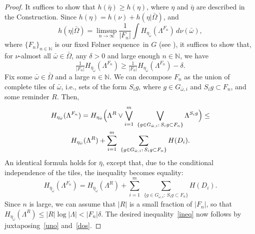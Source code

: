\documentclass{amsart}
\theoremstyle{remark}
\def \N {\mathbb N}
\def \sq {sequence}
\begin{document}
\begin{proof}
It suffices to show that $h(\bar\eta)\ge h(\eta)$, where $\eta$ and $\bar\eta$ are described in the Construction. Since $h(\eta)=h(\nu)+h(\eta|\bar\Omega)$, and
$$
h(\eta|\bar\Omega)=\limsup_{n\to\infty}\frac1{|F_n|}\int H_{\eta_{\bar\omega}}(\Lambda^{F_n})\,d\nu(\bar\omega),
$$
where $\{F_n\}_{n\in\N}$ is our fixed F\o lner \sq\ in $G$ (see \cite{13a}), it suffices to show that, for $\nu$-almost all $\bar\omega\in\bar\Omega$, any $\delta>0$ and large enough $n\in\N$, we have 
\begin{equation}\label{ineq}
\tfrac1{|F_n|}H_{\bar\eta_{\bar\omega}}(\Lambda^{F_n})\ge\tfrac1{|F_n|}H_{\eta_{\bar\omega}}(\Lambda^{F_n})-\delta.
\end{equation}
Fix some $\bar\omega\in\bar\Omega$ and a large $n\in\N$. We can decompose $F_n$ as the union of complete tiles of $\bar\omega$, i.e., sets of the form $S_ig$, where $g\in G_{\bar\omega,i}$ and $S_ig\subset F_n$, and some reminder $R$. Then, 
\begin{multline}\label{uno}
H_{\eta_{\bar\omega}}(\Lambda^{F_n})=H_{\eta_{\bar\omega}}\Bigl(\Lambda^R\vee\bigvee_{i=1}^m\ \bigvee_{\{g\in G_{\bar\omega,i}:\,S_ig\subset F_n\}}\Lambda^{S_ig}\Bigr)\le\\ 
H_{\eta_{\bar\omega}}(\Lambda^R)+\sum_{i=1}^m\ \sum_{\{g\in G_{\bar\omega,i}:\,S_ig\subset F_n\}}H(D_i).
\end{multline}
An identical formula holds for $\bar\eta$, except that, due to the conditional independence of the tiles, the inequality becomes equality:
\begin{equation}\label{dos}
H_{\bar\eta_{\bar\omega}}(\Lambda^{F_n})=H_{\bar\eta_{\bar\omega}}(\Lambda^R)+\sum_{i=1}^m\ \sum_{\{g\in G_{\bar\omega,i}:\,S_ig\subset F_n\}}H(D_i).
\end{equation}
Since $n$ is large, we can assume that $|R|$ is a small fraction of $|F_n|$, so that 
$H_{\eta_{\bar\omega}}(\Lambda^R)\le|R|\log|\Lambda|<|F_n|\delta$. The desired inequality~\eqref{ineq} now follows by juxtaposing~\eqref{uno} and~\eqref{dos}.
\end{proof}
\end{document}
